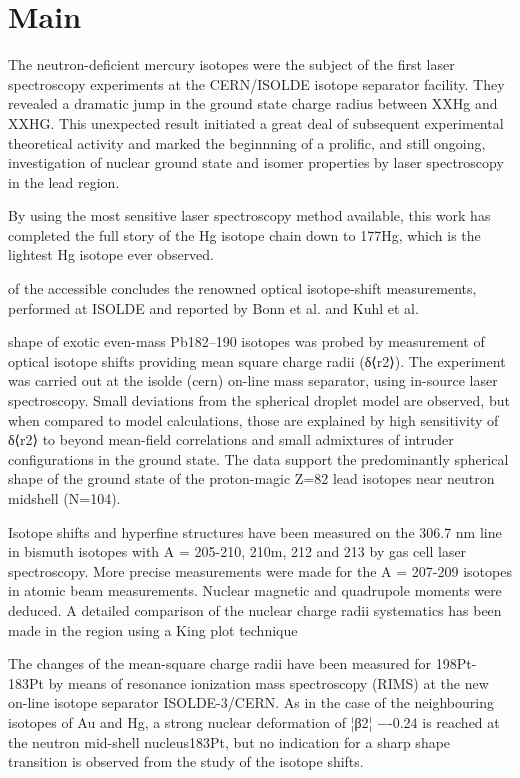 \section{Main} 


The neutron-deficient mercury isotopes were the subject of the first laser spectroscopy experiments at the CERN/ISOLDE isotope separator facility.  They revealed a dramatic jump in the ground state charge radius between XXHg and XXHG.  This unexpected result initiated a great deal of subsequent experimental theoretical activity and marked the beginnning of a prolific, and still ongoing, investigation of nuclear ground state and isomer properties by laser spectroscopy in the lead region.



By using the most sensitive laser spectroscopy method available, this work has completed the full story of the Hg isotope chain down to 177Hg, which is the lightest Hg isotope ever observed.

of the accessible  concludes the renowned optical isotope-shift measurements, performed at ISOLDE and reported by Bonn et al. and Kuhl et al.

shape of exotic even-mass Pb182–190 isotopes was probed by measurement of optical isotope shifts providing mean square charge radii (δ⟨r2⟩). The experiment was carried out at the isolde (cern) on-line mass separator, using in-source laser spectroscopy. Small deviations from the spherical droplet model are observed, but when compared to model calculations, those are explained by high sensitivity of δ⟨r2⟩ to beyond mean-field correlations and small admixtures of intruder configurations in the ground state. The data support the predominantly spherical shape of the ground state of the proton-magic Z=82 lead isotopes near neutron midshell (N=104).


Isotope shifts and hyperfine structures have been measured on the 306.7 nm line in bismuth isotopes with A = 205-210, 210m, 212 and 213 by gas cell laser spectroscopy. More precise measurements were made for the A = 207-209 isotopes in atomic beam measurements. Nuclear magnetic and quadrupole moments were deduced. A detailed comparison of the nuclear charge radii systematics has been made in the region using a King plot technique

The changes of the mean-square charge radii have been measured for 198Pt-183Pt by means of resonance ionization mass spectroscopy (RIMS) at the new on-line isotope separator ISOLDE-3/CERN. As in the case of the neighbouring isotopes of Au and Hg, a strong nuclear deformation of ¦β2¦ −-0.24 is reached at the neutron mid-shell nucleus183Pt, but no indication for a sharp shape transition is observed from the study of the isotope shifts.




